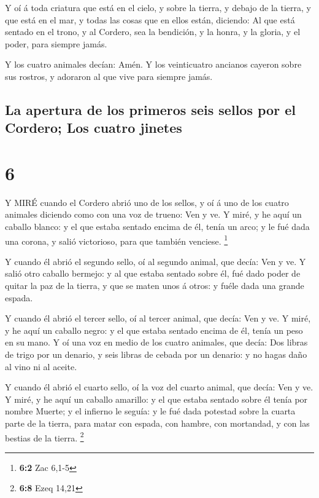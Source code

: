  Y oí á toda criatura que está en el cielo, y sobre la
tierra, y debajo de la tierra, y que está en el mar, y todas las cosas
que en ellos están, diciendo: Al que está sentado en el trono, y al
Cordero, sea la bendición, y la honra, y la gloria, y el poder, para
siempre jamás.

 Y los cuatro animales decían: Amén. Y los veinticuatro
ancianos cayeron sobre sus rostros, y adoraron al que vive para siempre
jamás.

\hypertarget{la-apertura-de-los-primeros-seis-sellos-por-el-cordero-los-cuatro-jinetes}{%
\subsection{La apertura de los primeros seis sellos por el Cordero; Los
cuatro
jinetes}\label{la-apertura-de-los-primeros-seis-sellos-por-el-cordero-los-cuatro-jinetes}}

\hypertarget{section-5}{%
\section{6}\label{section-5}}

 Y MIRÉ cuando el Cordero abrió uno de los sellos, y oí á
uno de los cuatro animales diciendo como con una voz de trueno: Ven y
ve.  Y miré, y he aquí un caballo blanco: y el que estaba
sentado encima de él, tenía un arco; y le fué dada una corona, y salió
victorioso, para que también venciese. \footnote{\textbf{6:2} Zac 6,1-5}

 Y cuando él abrió el segundo sello, oí al segundo animal,
que decía: Ven y ve.  Y salió otro caballo bermejo: y al que
estaba sentado sobre él, fué dado poder de quitar la paz de la tierra, y
que se maten unos á otros: y fuéle dada una grande espada.

 Y cuando él abrió el tercer sello, oí al tercer animal, que
decía: Ven y ve. Y miré, y he aquí un caballo negro: y el que estaba
sentado encima de él, tenía un peso en su mano.  Y oí una
voz en medio de los cuatro animales, que decía: Dos libras de trigo por
un denario, y seis libras de cebada por un denario: y no hagas daño al
vino ni al aceite.

 Y cuando él abrió el cuarto sello, oí la voz del cuarto
animal, que decía: Ven y ve.  Y miré, y he aquí un caballo
amarillo: y el que estaba sentado sobre él tenía por nombre Muerte; y el
infierno le seguía: y le fué dada potestad sobre la cuarta parte de la
tierra, para matar con espada, con hambre, con mortandad, y con las
bestias de la tierra. \footnote{\textbf{6:8} Ezeq 14,21}


